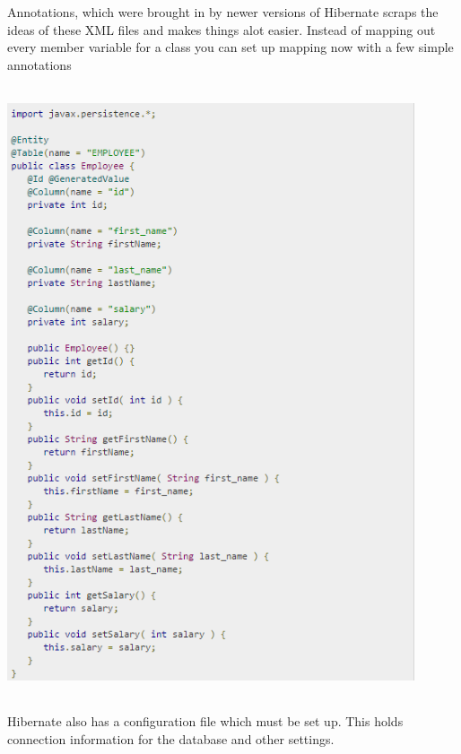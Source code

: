 Annotations, which were brought in by newer versions of Hibernate scraps the ideas of these XML files and makes things alot easier. Instead of mapping out every member variable for a class you can set up mapping now with a few simple annotations

\begin{center}    
	\includegraphics[height=18cm, width=12cm]{img/hibernateclass.png}
\end{center}

Hibernate also has a configuration file which must be set up. This holds connection information for the database and other settings.

